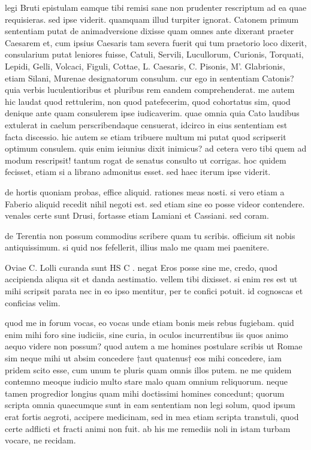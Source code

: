 


 legi Bruti epistulam eamque tibi remisi sane non prudenter rescriptum ad ea quae requisieras. sed ipse viderit. quamquam illud turpiter ignorat. Catonem primum sententiam putat de animadversione dixisse quam omnes ante dixerant praeter Caesarem et, cum ipsius Caesaris tam severa fuerit qui tum praetorio loco dixerit, consularium putat leniores fuisse, Catuli, Servili, Lucullorum, Curionis, Torquati, Lepidi, Gelli, Volcaci, Figuli, Cottae, L. Caesaris, C. Pisonis, M'. Glabrionis, etiam Silani, Murenae designatorum consulum. cur ego in sententiam Catonis? quia verbis luculentioribus et pluribus rem eandem comprehenderat. me autem hic laudat quod rettulerim, non quod patefecerim, quod cohortatus sim, quod denique ante quam consulerem ipse iudicaverim. quae omnia quia Cato laudibus extulerat in caelum perscribendaque censuerat, idcirco in eius sententiam est facta discessio. hic autem se etiam tribuere multum mi putat quod scripserit optimum consulem. quis enim ieiunius dixit inimicus? ad cetera vero tibi quem ad modum rescripsit! tantum rogat de senatus consulto ut corrigas. hoc quidem fecisset, etiam si a librano admonitus esset. sed haec iterum ipse viderit.

 de hortis quoniam probas, effice aliquid. rationes meas nosti. si vero etiam a Faberio aliquid recedit nihil negoti est. sed etiam sine eo posse videor contendere. venales certe sunt Drusi, fortasse etiam Lamiani et Cassiani. sed coram.

 de Terentia non possum commodius scribere quam tu scribis. officium sit nobis antiquissimum. si quid nos fefellerit, illius malo me quam mei paenitere.

 Oviae C. Lolli curanda sunt HS C . negat Eros posse sine me, credo, quod accipienda aliqua sit et danda aestimatio. vellem tibi dixisset. si enim res est ut mihi scripsit parata nec in eo ipso mentitur, per te confici potuit. id cognoscas et conficias velim.

 quod me in forum vocas, eo vocas unde etiam bonis meis rebus fugiebam. quid enim mihi foro sine iudiciis, sine curia, in oculos incurrentibus iis quos animo aequo videre non possum? quod autem a me homines postulare scribis ut Romae sim neque mihi ut absim concedere †aut quatenus† eos mihi concedere, iam pridem scito esse, cum unum te pluris quam omnis illos putem. ne me quidem contemno meoque iudicio multo stare malo quam omnium reliquorum. neque tamen progredior longius quam mihi doctissimi homines concedunt; quorum scripta omnia quaecumque sunt in eam sententiam non legi solum, quod ipsum erat fortis aegroti, accipere medicinam, sed in mea etiam scripta transtuli, quod certe adflicti et fracti animi non fuit. ab his me remediis noli in istam turbam vocare, ne recidam.
